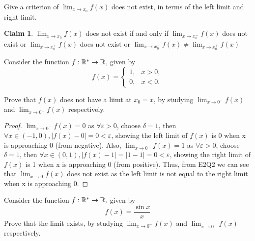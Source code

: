 \documentclass{homework}
\newcommand{\R}{\bb{R}} %
\newcommand{\ra}{\rightarrow}
\newcommand{\?}{\stackrel{?}{=}}
\newcommand{\ep}{\varepsilon}
\theoremstyle{definition}
\newtheorem*{claim}{Claim}
\begin{document}
\question[2] Give a criterion of $\lim_{x\ra x_0}f(x)$ does not exist, in terms of the left limit and right limit.

\begin{claim}
    \(\lim_{x\ra x_0}f(x)\) does not exist if and only if \(\lim_{x\ra x_0^-}f(x)\) does not exist or \(\lim_{x\ra x_0^+}f(x)\) does not exist or \(\lim_{x\ra x_0^-}f(x)\neq \lim_{x\ra x_0^+}f(x)\)
\end{claim}


\question[3] Consider the function $f:\R^*\ra\R$, given by $$f(x) = \begin{cases}
    1, & x>0, \\ 0, & x<0.
\end{cases}$$

Prove that $f(x)$ does not have a liimt at $x_0=x$, by studying $\lim_{x\ra 0^-}f(x)$ and \(\lim_{x\ra 0^+}f(x)\) respectively.

\begin{proof}
   $ \lim_{x\ra 0^-}f(x)=0$ as $\forall\ep>0$, choose $\delta=1$, then $\forall x\in(-1, 0), |f(x)-0|=0<\ep$, showing the left limit of $f(x)$ is 0 when x is approaching 0 (from negative). Also, $ \lim_{x\ra 0^+}f(x)=1$ as $\forall\ep>0$, choose $\delta=1$, then $\forall x\in(0,1), |f(x)-1|=|1-1|=0<\ep$, showing the right limit of $f(x)$ is 1 when x is approaching 0 (from positive). Thus, from E2Q2 we can see that $\lim_{x\ra0}f(x)$ does not exist as the left limit is not equal to the right limit when x is approaching 0.
\end{proof}

\question[4] Consider the function $f:\R^*\ra\R,$ given by \[f(x)=\frac{\sin x}{x}\] Prove that the limit exists, by studying \(\lim_{x\ra 0^-}f(x)\) and \(\lim_{x\ra 0^+}f(x)\) respectively.
\end{document}
